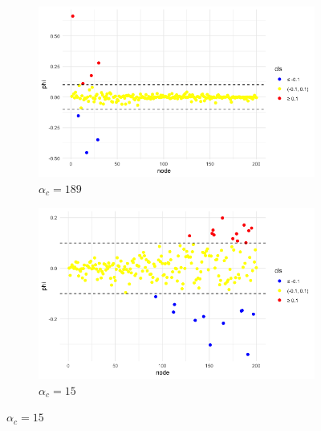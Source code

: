 \begin{figure}[H] %
  \centering
  \begin{subfigure}{0.48\textwidth}
    \centering
    \includegraphics[width=\linewidth]{Graphs/phi189_vs_node_N=200.png}
    \caption{\(\alpha_c=189\)}
  \end{subfigure}\hfill
  \begin{subfigure}{0.48\textwidth}
    \centering
    \includegraphics[width=\linewidth]{Graphs/phi15_vs_node_N=200.png}
    \caption{\(\alpha_c=15\)}
  \end{subfigure}

  \vspace{0.6em}


\end{figure}
